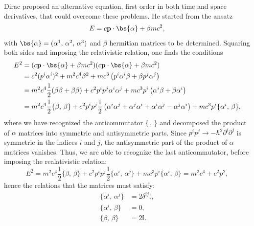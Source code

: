 Dirac proposed an alternative equation, first order in both time and space derivatives, that could overcome these problems. He started from the ansatz
\begin{equation}
    E = c \mathbf{p} \cdot \bs{\alpha} + \beta m c^2,
    \label{eq:dirac_equation_alpha_beta}
\end{equation}
with \(\bs{\alpha} = (\alpha^1,\,\alpha^2,\,\alpha^3)\) and \(\beta\) hermitian matrices to be determined. Squaring both sides and imposing the relativistic relation, one finds the conditions
\[
    \begin{aligned}
        E^2 & = (c \mathbf{p} \cdot \bs{\alpha} + \beta m c^2)(c \mathbf{p} \cdot \bs{\alpha} + \beta m c^2)                                                                                                 \\
            & = c^2 (p^i \alpha^i)^2 + m^2 c^4 \beta^2 + mc^3 \left(p^i \alpha^i \beta + \beta p^j \alpha^j \right)                                                                                          \\
            & = m^2 c^4 \frac{1}{2} (\beta\beta + \beta\beta) + c^2 p^i p^j \alpha^i \alpha^j + m c^3 p^i \left(\alpha^i \beta + \beta \alpha^i \right)                                                      \\
            & = m^2 c^4 \frac{1}{2} \{\beta,\,\beta\} + c^2 p^i p^j \frac{1}{2}\left(\alpha^i \alpha^j + \alpha^j \alpha^i + \alpha^i \alpha^j - \alpha^j \alpha^i \right) + m c^3 p^i \{\alpha^i,\,\beta\},
    \end{aligned}
\]
where we have recognized the anticommutator \(\{\,,\,\}\) and decomposed the product of \(\alpha\) matrices into symmetric and antisymmetric parts. Since \(p^i p^j \to -\hbar^2 \partial^i \partial^j\) is symmetric in the indices \(i\) and \(j\), the antisymmetric part of the product of \(\alpha\) matrices vanishes. Thus, we are able to recognize the last anticommutator, before imposing the realativistic relation:
\[
    E^2 = m^2 c^4 \frac{1}{2}\{\beta,\,\beta\} + c^2 p^i p^j \frac{1}{2} \{\alpha^i,\,\alpha^j\} + m c^3 p^i \{\alpha^i,\,\beta\} = m^2 c^4 + c^2 p^2,
\]
hence the relations that the matrices must satisfy:
\begin{equation}
    \begin{aligned}
        \{\alpha^i,\,\alpha^j\} & = 2 \delta^{ij} \mathbb{I}, \\
        \{\alpha^i,\,\beta\}    & = 0,                        \\
        \{\beta,\,\beta\}       & = 2 \mathbb{I}.
    \end{aligned}
    \label{eq:clifford_relations}
\end{equation}

